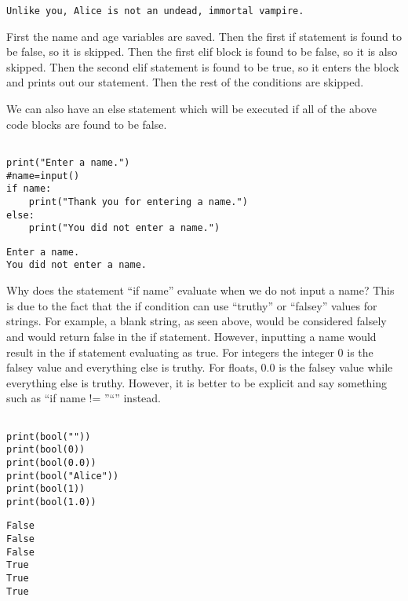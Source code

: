 \documentclass[11pt]{article}
\begin{document}
\begin{verbatim}
Unlike you, Alice is not an undead, immortal vampire.
\end{verbatim}


First the name and age variables are saved. Then the first if statement is found to be false, so it is skipped. Then the first elif block is found to be false, so it is also skipped. Then the second elif statement is found to be true, so it enters the block and prints out our statement. Then the rest of the conditions are skipped.

We can also have an else statement which will be executed if all of the above code blocks are found to be false.


\begin{verbatim}

print("Enter a name.")
#name=input()
if name:
    print("Thank you for entering a name.")
else:
    print("You did not enter a name.")
\end{verbatim}

\begin{verbatim}
Enter a name.
You did not enter a name.
\end{verbatim}


Why does the statement ``if name'' evaluate when we do not input a name? This is due to the fact that the if condition can use ``truthy'' or ``falsey'' values for strings. For example, a blank string, as seen above, would be considered falsely and would return false in the if statement. However, inputting a name would result in the if statement evaluating as true. For integers the integer 0 is the falsey value and everything else is truthy. For floats, 0.0 is the falsey value while everything else is truthy. However, it is better to be explicit and say something such as ``if name != ''``'' instead.


\begin{verbatim}

print(bool(""))
print(bool(0))
print(bool(0.0))
print(bool("Alice"))
print(bool(1))
print(bool(1.0))

\end{verbatim}

\begin{verbatim}
False
False
False
True
True
True
\end{verbatim}
\end{document}
